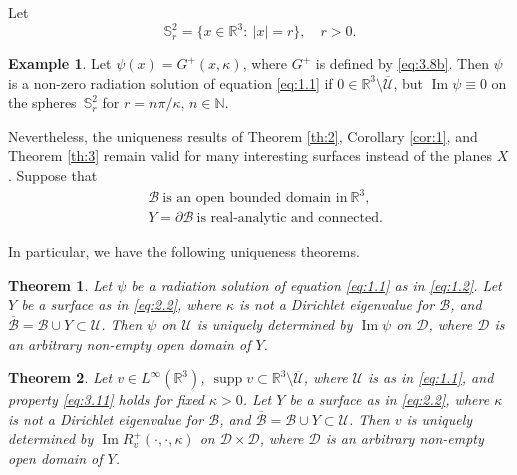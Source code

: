 \documentclass[JEP,XML,SOM,Unicode,NoEqCountersInSection,published]{cedram}
\DeclareMathOperator{\supp}{supp}
\newcommand{\RR}{\mathbb R}
\newcommand{\NN}{{\mathbb N}}
\renewcommand{\Im}{\mathop{\mathrm{Im}}}
\newtheorem{theorem}{Theorem}
\theoremstyle{definition}
\newtheorem{example}{Example}
\begin{document}
Let
\begin{equation}
\label{eq:2.1}
\mathbb S^2_r=\{x\in\RR^3:\ |x|=r\},\quad r>0.
\end{equation}

\begin{example}\label{ex:1}
Let $\psi(x)= G^+(x,\kappa)$, where $G^+$ is defined by \eqref{eq:3.8b}. Then $\psi$ is a non-zero radiation solution of equation \eqref{eq:1.1} if $0 \in \RR^3\setminus \overline {\mathcal{U}}$, but $\Im\psi \equiv 0$ on the spheres~$\mathbb S^2_r$ for
$r=n\pi/ \kappa$, $n \in\NN$.
\end{example}
Nevertheless, the uniqueness results of Theorem \ref{th:2}, Corollary \ref{cor:1}, and Theorem \ref{th:3} remain valid for many interesting surfaces instead of the planes $X$.
Suppose that
\begin{equation}\label{eq:2.2}
\begin{aligned}
&\mathcal{B}\ \mbox{is\ an\ open\ bounded\ domain\ in}\ \RR^3, \\
&Y=\partial \mathcal{B}\ \mbox{is\ real-analytic\ and\ connected}.
\end{aligned}
\end{equation}

In particular, we have the following uniqueness theorems.

\begin{theorem}\label{th:4}
Let $\psi$ be a radiation solution of equation \eqref{eq:1.1} as in \eqref{eq:1.2}.
Let $Y$ be a surface as in \eqref{eq:2.2},
where $\kappa$ is not a Dirichlet eigenvalue for $\mathcal{B}$, and $\overline{\mathcal{B}}= \mathcal{B} \cup Y \subset \mathcal{U}$.
Then $\psi$ on $\mathcal{U}$ is uniquely determined by $\Im \psi$ on $\mathcal{D}$,
where $\mathcal{D}$ is an arbitrary non-empty open domain of $Y$.
\end{theorem}

\begin{theorem}\label{th:5}
Let $v \in L^{\infty}(\RR^3)$, $\supp v \subset \RR^3 \setminus \overline {\mathcal{U}}$, where $\mathcal{U}$ is as in \eqref{eq:1.1},
and property \eqref{eq:3.11} holds for fixed $\kappa>0$.
Let $Y$ be a surface as in \eqref{eq:2.2},
where $\kappa$ is not a Dirichlet eigenvalue for $\mathcal{B}$, and $\overline{\mathcal{B}}= \mathcal{B} \cup Y \subset \mathcal{U}$.
Then $v$ is uniquely determined by $\Im R_v^+(\cdot, \cdot, \kappa)$ on $\mathcal{D} \times \mathcal{D}$,
where $\mathcal{D}$ is an arbitrary non-empty open domain of $Y$.
\end{theorem}
\end{document}
